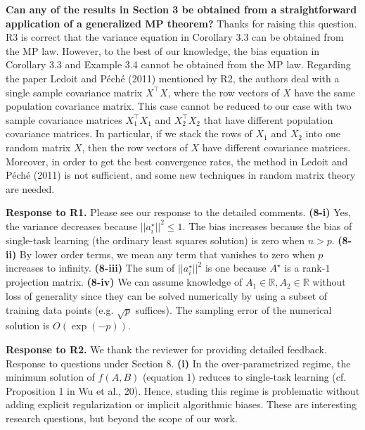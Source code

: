 \documentclass{article}
\begin{document}
	\textbf{Can any of the results in Section 3 be obtained from a straightforward application of a generalized MP theorem?}
	Thanks for raising this question. R3 is correct that the variance equation in Corollary 3.3 can be obtained from the MP law.
	However, to the best of our knowledge, the bias equation in Corollary 3.3 and Example 3.4 cannot be obtained from the MP law.
	Regarding the paper Ledoit and P{\'e}ch{\'e} (2011) mentioned by R2, the authors deal with a single sample covariance matrix $X^\top X$, where the row vectors of $X$ have the same population covariance matrix. This case cannot be reduced to our case with two sample covariance matrices $X_1^\top X_1$ and $X_2^\top X_2$ that have different population covariance matrices. In particular, if we stack the rows of $X_1$ and $X_2$ into one random matrix $X$, then the row vectors of $X$ have different covariance matrices. Moreover, in order to get the best convergence rates, the method in  Ledoit and P{\'e}ch{\'e} (2011) is not sufficient, and some new techniques in random matrix theory are needed. 

	\textbf{Response to R1.} Please see our response to the detailed comments.
	\textbf{(8-i)} Yes, the variance decreases because $||{a_i^{\star}}||^2 \le 1$.
	The bias increases because the bias of single-task learning (the ordinary least squares solution) is zero when $n > p$.
	\textbf{(8-ii)} By lower order terms, we mean any term that vanishes to zero when $p$ increases to infinity.
	\textbf{(8-iii)} The sum of $||{a_i^{\star}}||^2$ is one because $A^{\star}$ is a rank-$1$ projection matrix.
	\textbf{(8-iv)} %
	We can assume knowledge of $A_1 \in \mathbb R, A_2 \in \mathbb R$ without loss of generality since they can be solved numerically by using a subset of training data points (e.g. $\sqrt{p}$ suffices).
	The sampling error of the numerical solution is $O(\exp(-p))$.

	\textbf{Response to R2.} We thank the reviewer for providing detailed feedback.
	Response to questions under Section 8.
	\textbf{(i)}
	In the over-parametrized regime, the minimum solution of $f(A ,B)$ (equation 1) reduces to single-task learning  (cf. Proposition 1 in Wu et al., 20).
	Hence, studing this regime is problematic without adding explicit regularization or implicit algorithmic biases.
	These are interesting research questions, but beyond the scope of our work.
\end{document}
